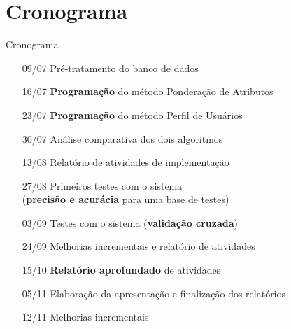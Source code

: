 \section[Cronograma]{Cronograma}
\begin{frame}{Cronograma}
\begin{itemize}
	\item[09/07] Pré-tratamento do banco de dados
 	\item[16/07] \textbf{Programação} do método Ponderação de Atributos
 	\item[23/07] \textbf{Programação} do método Perfil de Usuários
 	\item[30/07] Análise comparativa dos dois algoritmos
 	\item[]
 	\item[13/08] Relatório de atividades de implementação
 	\item[27/08] Primeiros testes com o sistema \\(\textbf{precisão e acurácia} para uma base de testes)
 	\item[]
 	\item[03/09] Testes com o sistema (\textbf{validação cruzada})
 	\item[24/09] Melhorias incrementais e relatório de atividades
 	\item[]
 	\item[15/10] \textbf{Relatório aprofundado} de atividades
 	\item[]
 	\item[05/11] Elaboração da apresentação e finalização dos relatórios
 	\item[12/11] Melhorias incrementais
\end{itemize}
\end{frame}
